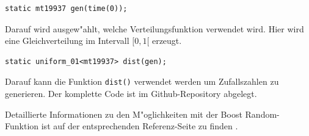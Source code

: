 \begin{refsection}
\begin{lstlisting}[style=C]
static mt19937 gen(time(0));
\end{lstlisting}

Darauf wird ausgew"ahlt, welche Verteilungsfunktion verwendet wird. Hier
wird eine Gleichverteilung im Intervall $[0,1[$ erzeugt.

\begin{lstlisting}[style=C]
static uniform_01<mt19937> dist(gen); 
\end{lstlisting}

Darauf kann die Funktion \texttt{dist()} verwendet werden um
Zufallszahlen zu generieren. Der komplette Code ist im Github-Repository
\cite{rng:githubRepo} abgelegt.

Detaillierte Informationen zu den M"oglichkeiten mit der Boost
Random-Funktion ist auf der entsprechenden Referenz-Seite zu finden
\cite{rng:boostRandom}.



\newpage
\printbibliography[heading=subbibliography]
\end{refsection}
